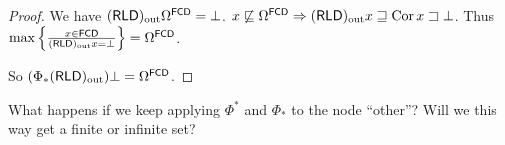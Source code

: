 \begin{proof}
We have $(\mathsf{RLD})_{\mathrm{out}}\Omega^{\mathsf{FCD}} = \bot$.
$x\not\sqsubseteq\Omega^{\mathsf{FCD}} \Rightarrow
(\mathsf{RLD})_{\mathrm{out}} x\sqsupseteq\operatorname{Cor} x\sqsupset\bot$.
Thus $\max\left\{ \frac{x\in\mathsf{FCD}}{(\mathsf{RLD})_{\mathrm{out}} x=\bot}\right\}=
\Omega^{\mathsf{FCD}}$.

So $(\Phi_{\ast}(\mathsf{RLD})_{\mathrm{out}})\bot = \Omega^{\mathsf{FCD}}$.
\end{proof}

\begin{question}
What happens if we keep applying $\Phi^{\ast}$ and $\Phi_{\ast}$ to the node ``other''?
Will we this way get a finite or infinite set?
\end{question}
